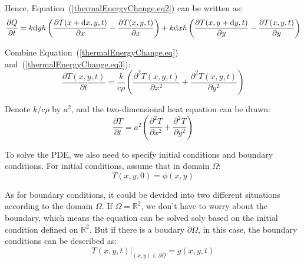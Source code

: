 Hence, Equation~(\ref{thermalEnergyChange.eq2}) can be written as:
\begin{equation}\label{thermalEnergyChange.eq3}
\frac{\partial Q}{\partial t}=k\mathrm d yh\left(\frac{\partial T(x+\mathrm d x,y,t)}{\partial x}-\frac{\partial T(x,y,t)}{\partial x}\right)+k\mathrm d xh\left(\frac{\partial T(x,y+\mathrm d y,t)}{\partial y}-\frac{\partial T(x,y,t)}{\partial y}\right)
\end{equation}

Combine Equation~(\ref{thermalEnergyChange.eq}) and~(\ref{thermalEnergyChange.eq3}):
\begin{equation}
\frac{\partial T(x,y,t)}{\partial t}=\frac{k}{c\rho}\left(\frac{\partial ^2 T(x,y,t)}{\partial x^2}+\frac{\partial ^2 T(x,y,t)}{\partial y^2}\right)
\end{equation}

Denote $k/c\rho$ by $a^2$, and the two-dimensional heat equation can be drawn:
\begin{equation}
\frac{\partial T}{\partial t}=a^2\left(\frac{\partial ^2 T}{\partial x^2}+\frac{\partial ^2 T}{\partial y^2}\right)
\end{equation}

To solve the PDE, we also need to specify initial conditions and boundary conditions. For initial conditions, assume that in domain $\Omega$:
\begin{equation}
T(x,y,0)=\phi(x,y) 
\end{equation}

As for boundary conditions, it could be devided into two different situations according to the domain $\Omega$. If $\Omega=\mathbb{R}^2$, we don't have to worry about the boundary, which means the equation can be solved soly based on the initial condition defined on $\mathbb{R}^2$. But if there is a boudary $\partial\Omega$, in this case, the boundary conditions can be described as: 
\begin{equation}
T(x,y,t)|_{(x,y)\in\partial\Omega} =g(x,y,t) 
\end{equation}

